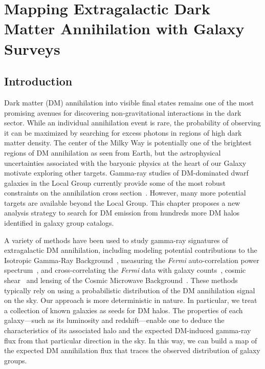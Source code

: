 \chapter{Mapping Extragalactic Dark Matter Annihilation with Galaxy Surveys}
\label{ch:groups_sim}

\section{Introduction}

Dark matter (DM) annihilation into visible final states remains one of the most promising avenues for discovering non-gravitational interactions in the dark sector.  While an individual annihilation event is rare, the probability of observing it can be maximized by searching for excess photons in regions of high dark matter density.  The center of the Milky Way is potentially one of the brightest regions of DM annihilation as seen from Earth, but the astrophysical uncertainties associated with the baryonic physics at the heart of our Galaxy motivate exploring other targets.  Gamma-ray studies of DM-dominated dwarf galaxies in the Local Group currently provide some of the most robust constraints on the annihilation cross section~\cite{Fermi-LAT:2016uux, Ackermann:2015zua}.  However, many more potential targets are available beyond the Local Group.  This chapter proposes a new analysis strategy to search for DM emission from hundreds more DM halos identified in galaxy group catalogs.  

A variety of methods have been used to study gamma-ray signatures of extragalactic DM annihilation, including modeling potential contributions to the Isotropic Gamma-Ray Background~\cite{Bengtsson:1990xf,Bergstrom:2001jj,Ullio:2002pj,Bottino:2004qi,Bertone:2004pz,Bringmann:2012ez,Ajello:2015mfa, DiMauro:2015tfa, Ackermann:2015tah, Feng:2016fkl}, measuring the \emph{Fermi} auto-correlation power spectrum~\cite{Ackermann:2012uf,Fornasa:2016ohl,Ando:2006cr,Ando:2013ff}, and cross-correlating the \emph{Fermi} data with galaxy counts~\cite{Branchini:2016glc, Xia:2011ax,Ando:2014aoa,Ando:2013xwa,Xia:2015wka,Regis:2015zka,Cuoco:2015rfa,Ando:2016ang}, cosmic shear~\cite{Camera:2014rja,Troster:2016sgf,Choi:2015mnp,Camera:2012cj,Shirasaki:2015nqp,Shirasaki:2014noa,Shirasaki:2016kol} and lensing of the Cosmic Microwave Background~\cite{Fornengo:2014cya, Feng:2016fkl}.  These methods typically rely on using a probabilistic distribution of the DM annihilation signal on the sky.  Our approach is more deterministic in nature.  In particular, we treat a collection of known galaxies as seeds for DM halos.  The properties of each galaxy---such as its luminosity and redshift---enable one to deduce the characteristics of its associated halo and the expected DM-induced gamma-ray flux from that particular direction in the sky.  In this way, we can build a map of the expected DM annihilation flux that traces  the observed distribution of galaxy groups. 

